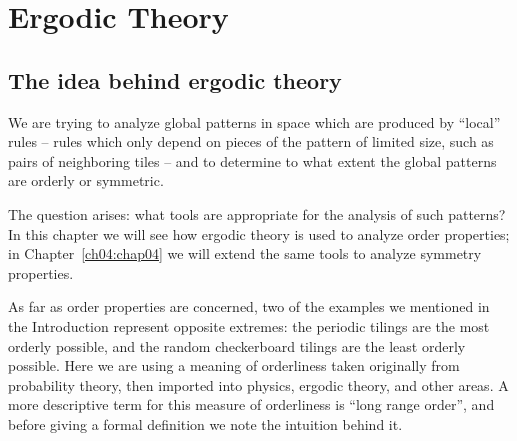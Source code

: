 \documentclass[reqno]{stml-l}
\theoremstyle{plain}
\theoremstyle{definition}
\numberwithin{equation}{chapter}
\begin{document}

\chapter{Ergodic Theory\label{ch01:chap01}}

\section{The idea behind ergodic theory}\label{ch01:sec1}

We are trying to analyze global patterns in space which are produced by ``local'' rules -- rules which only depend on pieces of the pattern of limited size, such as pairs of neighboring tiles -- and to determine to what extent the global patterns are orderly or symmetric.

The question arises: what tools are appropriate for the analysis of such patterns? In this chapter we will see how ergodic theory is used to analyze order properties; in Chapter~\ref{ch04:chap04} we will extend the same tools to analyze symmetry properties.

As far as order properties are concerned, two of the examples we mentioned in the Introduction represent opposite extremes: the periodic tilings are the most orderly possible, and the random checkerboard tilings are the least orderly possible. Here we are using a meaning of orderliness taken originally from probability theory, then imported into physics, ergodic theory, and other areas. A more descriptive term for this measure of orderliness is ``long range order'', and before giving a formal definition we note the intuition behind it.
\end{document}
